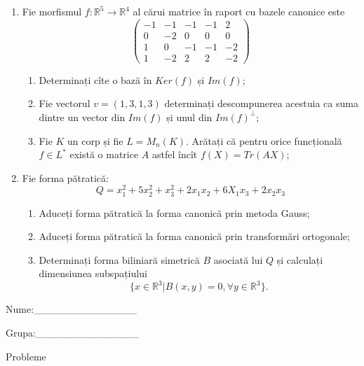 \documentclass{article}
\begin{document}
\begin{enumerate}
 \item Fie morfismul $f:\mathbb{R}^5 \to \mathbb{R}^4$ al cărui matrice în raport cu bazele canonice este
$$\begin{pmatrix}
-1&-1&-1&-1&2\\
0&-2&0&0&0\\
1&0&-1&-1&-2\\
1&-2&2&2&-2
\end{pmatrix}$$

\begin{enumerate}
\item Determinați cîte o bază în $Ker(f)$ și $Im(f)$;
\item Fie vectorul $v=(1,3,1,3)$ determinați descompunerea acestuia ca suma dintre un vector din $Im(f)$ și unul din $Im(f)^\perp$;
\item Fie $K$ un corp și fie $L=M_n(K)$. Arătați că pentru orice funcțională $f \in L^*$ există o matrice $A$ astfel încît $f(X)=Tr(AX)$;
\end{enumerate}
\item Fie forma pătratică:
$$Q= x_1^2+5x_2^2+x_3^2+2x_1x_2+6X_1x_3+2x_2x_3$$

\begin{enumerate}
\item Aduceți forma pătratică la forma canonică prin metoda Gauss;
\item Aduceți forma pătratică la forma canonică prin transformări ortogonale;
\item Determinați forma biliniară simetrică $B$ asociată lui $Q$ și calculați dimensiunea subspațiului
$$\{x \in \mathbb{R}^3 | B(x,y)=0,\forall y \in \mathbb{R}^3\}.$$

\end{enumerate}
\end{enumerate}
\newpage
\begin{flushright}
Nume:\_\_\_\_\_\_\_\_\_\_\_\_\_\_
 
 
Grupa:\_\_\_\_\_\_\_\_\_\_\_\_\_\_
\end{flushright}
\begin{center}
\vspace{2cm}
{\Large Probleme}
\vspace{2cm}
\end{center}
\end{document}
